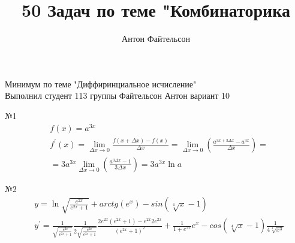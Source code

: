 \documentclass[a4paper,14pt]{extreport} %
\title{50 Задач по теме "Комбинаторика}
\author{Антон Файтельсон}
\date{}
\begin{document}
			\begin{flushleft}
				\large Минимум по теме "Диффиринциальное исчисление"		\\
				Выполнил студент 113 группы Файтельсон Антон вариант 10
			\end{flushleft}
			
			№1
			\begin{align}
				&f(x) = a^{3x}\\
				&f^{'}(x) = \lim_{\Delta x \rightarrow 0} \frac{f(x+\Delta x) - f(x)}{\Delta x} = 
				\lim_{\Delta x \rightarrow 0} (\frac{a^{3x+3\Delta x} - a^{3x}}{\Delta x}) = \\
				&= 3a^{3x}\lim_{\Delta x \rightarrow 0} (\frac{a^{3\Delta x} - 1}{3 \Delta x}) = 3a^{3x}\ln{a}
			\end{align}
		
			
			№2
			\begin{align}
				&y = \ln{\sqrt{\frac{e^{2x}}{e^{2x}+1}}} + arctg(e^x) - sin(\sqrt[4]{x} - 1)\\
				&y^{'} = \frac{1}{\sqrt{\frac{e^{2x}}{e^{2x}+1}}}\frac{1}{2\sqrt{\frac{e^{2x}}{e^{2x}+1}}}\frac{2e^{2x}(e^{2x}+1)-e^{2x}2e^{2x} }{(e^{2x}+1)^2} + \frac{1}{1+e^{2x}}e^x - cos(\sqrt[4]{x} - 1)\frac{1}{4\sqrt[4]{x^3}}
			\end{align}
\end{document}
